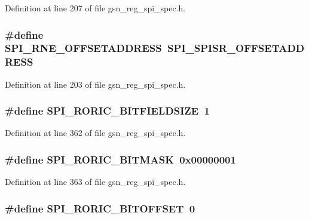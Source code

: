 Definition at line 207 of file gsn\_\-reg\_\-spi\_\-spec.h.

\hypertarget{a00573_a45efe987414d6417e82243e0c63feb0b}{
\subsubsection[{SPI\_\-RNE\_\-OFFSETADDRESS}]{\setlength{\rightskip}{0pt plus 5cm}\#define SPI\_\-RNE\_\-OFFSETADDRESS~SPI\_\-SPISR\_\-OFFSETADDRESS}}
\label{a00573_a45efe987414d6417e82243e0c63feb0b}


Definition at line 203 of file gsn\_\-reg\_\-spi\_\-spec.h.

\hypertarget{a00573_a7425ed2f8f04ed2b9a0bced83d4dffa4}{
\subsubsection[{SPI\_\-RORIC\_\-BITFIELDSIZE}]{\setlength{\rightskip}{0pt plus 5cm}\#define SPI\_\-RORIC\_\-BITFIELDSIZE~1}}
\label{a00573_a7425ed2f8f04ed2b9a0bced83d4dffa4}


Definition at line 362 of file gsn\_\-reg\_\-spi\_\-spec.h.

\hypertarget{a00573_a13749d1556601632887df6fb9dfee6f6}{
\subsubsection[{SPI\_\-RORIC\_\-BITMASK}]{\setlength{\rightskip}{0pt plus 5cm}\#define SPI\_\-RORIC\_\-BITMASK~0x00000001}}
\label{a00573_a13749d1556601632887df6fb9dfee6f6}


Definition at line 363 of file gsn\_\-reg\_\-spi\_\-spec.h.

\hypertarget{a00573_a54d2e2e72b4afa7c6e31f86c4d437b43}{
\subsubsection[{SPI\_\-RORIC\_\-BITOFFSET}]{\setlength{\rightskip}{0pt plus 5cm}\#define SPI\_\-RORIC\_\-BITOFFSET~0}}
\label{a00573_a54d2e2e72b4afa7c6e31f86c4d437b43}


